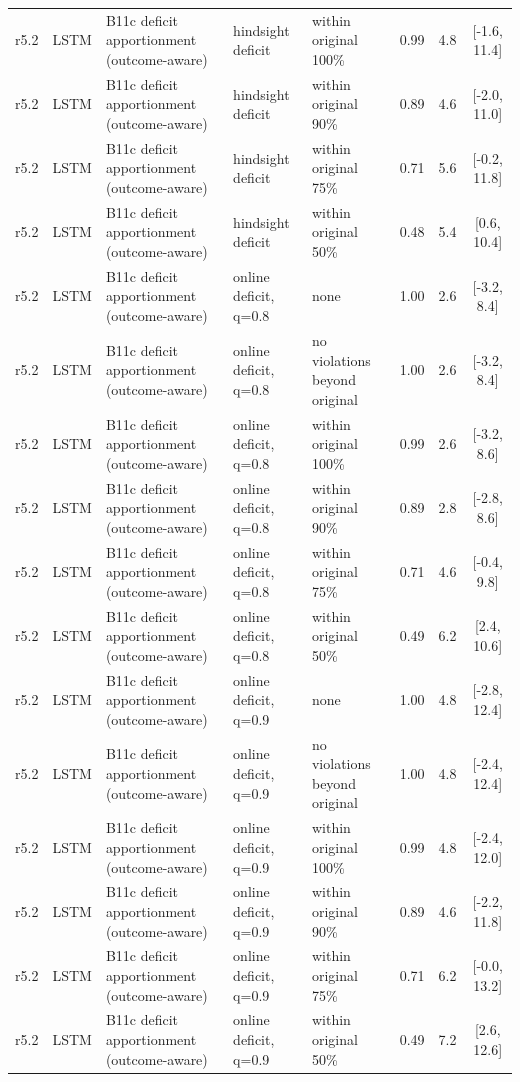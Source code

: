 \begin{longtable}{lllp{4.2cm}p{3.4cm}ccc}
r5.2 & LSTM & B11c deficit apportionment (outcome-aware) & hindsight deficit & within original 100\% & 0.99 & 4.8 & [-1.6, 11.4] \\
r5.2 & LSTM & B11c deficit apportionment (outcome-aware) & hindsight deficit & within original 90\% & 0.89 & 4.6 & [-2.0, 11.0] \\
r5.2 & LSTM & B11c deficit apportionment (outcome-aware) & hindsight deficit & within original 75\% & 0.71 & 5.6 & [-0.2, 11.8] \\
r5.2 & LSTM & B11c deficit apportionment (outcome-aware) & hindsight deficit & within original 50\% & 0.48 & 5.4 & [0.6, 10.4] \\
r5.2 & LSTM & B11c deficit apportionment (outcome-aware) & online deficit, q=0.8 & none & 1.00 & 2.6 & [-3.2, 8.4] \\
r5.2 & LSTM & B11c deficit apportionment (outcome-aware) & online deficit, q=0.8 & no violations beyond original & 1.00 & 2.6 & [-3.2, 8.4] \\
r5.2 & LSTM & B11c deficit apportionment (outcome-aware) & online deficit, q=0.8 & within original 100\% & 0.99 & 2.6 & [-3.2, 8.6] \\
r5.2 & LSTM & B11c deficit apportionment (outcome-aware) & online deficit, q=0.8 & within original 90\% & 0.89 & 2.8 & [-2.8, 8.6] \\
r5.2 & LSTM & B11c deficit apportionment (outcome-aware) & online deficit, q=0.8 & within original 75\% & 0.71 & 4.6 & [-0.4, 9.8] \\
r5.2 & LSTM & B11c deficit apportionment (outcome-aware) & online deficit, q=0.8 & within original 50\% & 0.49 & 6.2 & [2.4, 10.6] \\
r5.2 & LSTM & B11c deficit apportionment (outcome-aware) & online deficit, q=0.9 & none & 1.00 & 4.8 & [-2.8, 12.4] \\
r5.2 & LSTM & B11c deficit apportionment (outcome-aware) & online deficit, q=0.9 & no violations beyond original & 1.00 & 4.8 & [-2.4, 12.4] \\
r5.2 & LSTM & B11c deficit apportionment (outcome-aware) & online deficit, q=0.9 & within original 100\% & 0.99 & 4.8 & [-2.4, 12.0] \\
r5.2 & LSTM & B11c deficit apportionment (outcome-aware) & online deficit, q=0.9 & within original 90\% & 0.89 & 4.6 & [-2.2, 11.8] \\
r5.2 & LSTM & B11c deficit apportionment (outcome-aware) & online deficit, q=0.9 & within original 75\% & 0.71 & 6.2 & [-0.0, 13.2] \\
r5.2 & LSTM & B11c deficit apportionment (outcome-aware) & online deficit, q=0.9 & within original 50\% & 0.49 & 7.2 & [2.6, 12.6] \\

\end{longtable}
